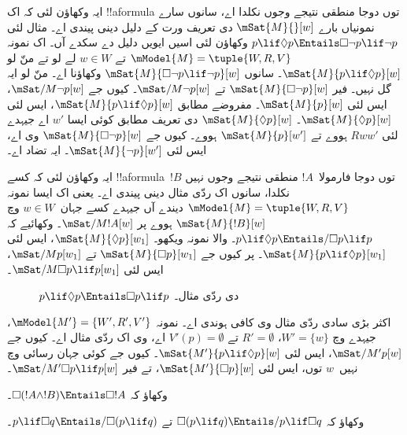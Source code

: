 \documentclass[../../../include/open-logic-section]{subfiles}
\begin{document}
\begin{ex}
  ایہ وکھاؤن لئی کہ اک !!a{formula} توں دوجا منطقی نتیجے وجوں نکلدا اے، سانوں سارے نمونیاں بارے $\mSat{M}{}[w]$ دی تعریف ورت کے دلیل دینی پیندی اے۔ مثال لئی
  $p \lif \Diamond p \Entails \Box\lnot p \lif \lnot p$ وکھاؤن لئی اسیں ایویں دلیل دے سکدے آں۔ اک نمونہ $\mModel{M} = \tuple{W, R,
    V}$ تے $w \in W$ لے لو تے منّ لو $\mSat{M}{p \lif \Diamond
    p}[w]$۔ سانوں $\mSat{M}{\Box\lnot p \lif \lnot
    p}[w]$ وکھاؤنا اے۔ منّ لو ایہ گل نہیں۔ فیر $\mSat{M}{\Box\lnot p}[w]$ تے
  $\mSat/{M}{\lnot p}[w]$۔ کیوں جے $\mSat/{M}{\lnot p}[w]$، ایس لئی $\mSat{M}{
    p}[w]$۔ مفروضے مطابق $\mSat{M}{p \lif \Diamond p}[w]$، ایس لئی
  $\mSat{M}{\Diamond p}[w]$۔ $\mSat{M}{\Diamond
    p}[w]$ دی تعریف مطابق کوئی ایسا $w'$ اے جیہدے لئی $Rww'$ ہووے تے
  $\mSat{M}{p}[w']$ ہووے۔ کیوں جے $\mSat{M}{\Box \lnot p}[w]$ وی اے، ایس لئی
  $\mSat{M}{\lnot p}[w']$۔ ایہ تضاد اے۔

  ایہ وکھاؤن لئی کہ کسے !!a{formula}~$!B$ توں دوجا فارمولا~$!A$ منطقی نتیجے وجوں نہیں نکلدا، سانوں اک ردّی مثال دینی پیندی اے۔ یعنی اک ایسا نمونہ $\mModel{M} = \tuple{W, R,
    V}$ دیندے آں جیہدے کسے جہان~$w \in W$ وچ $\mSat{M}{!B}[w]$ ہووے
  پر $\mSat/{M}{!A}[w]$۔ وکھائیے کہ $p \lif \Diamond p \Entails/
  \Box p \lif p$۔  والا نمونہ ویکھو۔
  $\mSat{M}{\Diamond p}[w_1]$، ایس لئی $\mSat{M}{p \lif
    \Diamond p}[w_1]$۔ پر کیوں جے $\mSat{M}{\Box p}[w_1]$ تے
  $\mSat/{M}{p}[w_1]$، ایس لئی $\mSat/{M}{\Box p \lif p}[w_1]$۔
  \begin{figure}
  \begin{center}
  \end{center}
  \caption{$p \lif \Diamond p
  \Entails \Box p \lif p$ دی ردّی مثال۔}
  \end{figure}

  اکثر بڑی سادی ردّی مثال وی کافی ہوندی اے۔ نمونہ $\mModel{M'} =
  \{W', R', V'\}$، جیہدے وچ $W' = \{w\}$، $R' = \emptyset$ تے $V'(p) =
  \emptyset$ اے، وی اک ردّی مثال اے۔ کیوں جے $\mSat/{M'}{p}[w]$،
  ایس لئی $\mSat{M'}{p \lif \Diamond p}[w]$۔ کیوں جے کوئی جہان رسائی وچ نہیں~$w$ توں، ایس لئی $\mSat{M'}{\Box p}[w]$، تے فیر $\mSat/{M'}{\Box p
    \lif p}[w]$۔
\end{ex}

\begin{prob}
  وکھاؤ کہ $\Box (!A \land !B) \Entails \Box !A$۔
\end{prob}

\begin{prob}
  وکھاؤ کہ $\Box (p \lif q) \Entails/ p \lif \Box q$ تے $p \lif \Box
  q \Entails/\Box (p \lif q)$۔
\end{prob}
\end{document}
